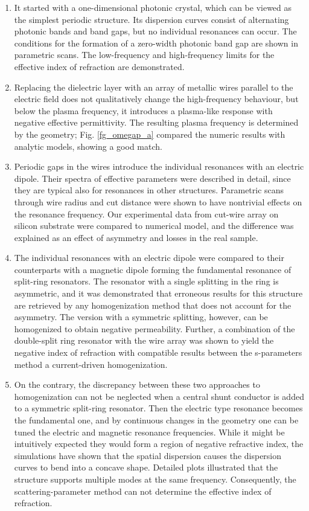 \begin{enumerate}
\item{It started with a one-dimensional photonic crystal, which can be viewed as the simplest periodic structure. Its dispersion curves consist of alternating photonic bands and band gaps, but no individual resonances can occur. The conditions for the formation of a zero-width photonic band gap are shown in parametric scans. The low-frequency and high-frequency limits for the effective index of refraction are demonstrated.
} 
\item{Replacing the dielectric layer with an array of metallic wires parallel to the electric field does not qualitatively change the high-frequency behaviour, but below the plasma frequency, it introduces a plasma-like response with negative effective permittivity. The resulting plasma frequency is determined by the geometry; Fig. \ref{fg_omegap_a} compared the numeric results with analytic models, showing a good match.
} 
\item{Periodic gaps in the wires introduce the individual resonances with an electric dipole. Their spectra of effective parameters were described in detail, since they are typical also for resonances in other structures. Parametric scans through wire radius and cut distance were shown to have nontrivial effects on the resonance frequency. Our experimental data from cut-wire array on silicon substrate were compared to numerical model, and the difference was explained as an effect of asymmetry and losses in the real sample. 
} 
\item{The individual resonances with an electric dipole were compared to their counterparts with a magnetic dipole forming the fundamental resonance of split-ring resonators. The resonator with a single splitting in the ring is asymmetric, and it was demonstrated that  erroneous results for this structure are retrieved by any homogenization method that does not account for the asymmetry. The version with a symmetric splitting, however, can be homogenized to obtain negative permeability. Further, a combination of the double-split ring resonator with the wire array was shown to yield the negative index of refraction with compatible results between the s-parameters method a current-driven homogenization.
} 
\item{On the contrary, the discrepancy between these two approaches to homogenization can not be neglected when a central shunt conductor is added to a symmetric split-ring resonator. Then the electric type resonance becomes the fundamental one, and by continuous changes in the geometry one  can be tuned the electric and magnetic resonance frequencies. While it might be intuitively expected they would form a region of negative refractive index, the simulations have shown that the spatial dispersion causes the dispersion curves to bend into a concave shape. Detailed plots illustrated that the structure supports multiple modes at the same frequency. Consequently, the scattering-parameter method can not determine the effective index of refraction.
}
\end{enumerate}
